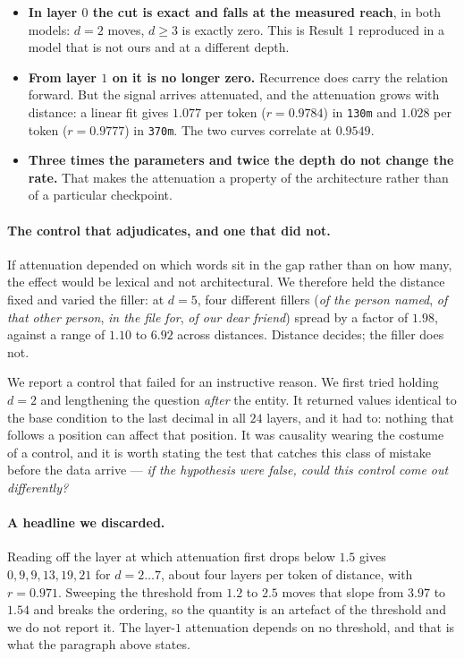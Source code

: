 \documentclass[10pt]{article}
\begin{document}
\begin{itemize}
\item \textbf{In layer $0$ the cut is exact and falls at the measured reach}, in both models: $d{=}2$
moves, $d \ge 3$ is exactly zero. This is Result 1 reproduced in a model that is not ours and at a
different depth.
\item \textbf{From layer $1$ on it is no longer zero.} Recurrence does carry the relation forward.
But the signal arrives attenuated, and the attenuation grows with distance: a linear fit gives
$1.077$ per token ($r = 0.9784$) in \texttt{130m} and $1.028$ per token ($r = 0.9777$) in
\texttt{370m}. The two curves correlate at $0.9549$.
\item \textbf{Three times the parameters and twice the depth do not change the rate.} That makes the
attenuation a property of the architecture rather than of a particular checkpoint.
\end{itemize}

\paragraph{The control that adjudicates, and one that did not.} If attenuation depended on which words
sit in the gap rather than on how many, the effect would be lexical and not architectural. We
therefore held the distance fixed and varied the filler: at $d{=}5$, four different fillers
(\emph{of the person named}, \emph{of that other person}, \emph{in the file for}, \emph{of our dear
friend}) spread by a factor of $1.98$, against a range of $1.10$ to $6.92$ across distances. Distance
decides; the filler does not.

We report a control that failed for an instructive reason. We first tried holding $d{=}2$ and
lengthening the question \emph{after} the entity. It returned values identical to the base condition
to the last decimal in all $24$ layers, and it had to: nothing that follows a position can affect that
position. It was causality wearing the costume of a control, and it is worth stating the test that
catches this class of mistake before the data arrive --- \emph{if the hypothesis were false, could
this control come out differently?}

\paragraph{A headline we discarded.} Reading off the layer at which attenuation first drops below
$1.5$ gives $0, 9, 9, 13, 19, 21$ for $d = 2 \ldots 7$, about four layers per token of distance, with
$r = 0.971$. Sweeping the threshold from $1.2$ to $2.5$ moves that slope from $3.97$ to $1.54$ and
breaks the ordering, so the quantity is an artefact of the threshold and we do not report it. The
layer-$1$ attenuation depends on no threshold, and that is what the paragraph above states.
\end{document}
